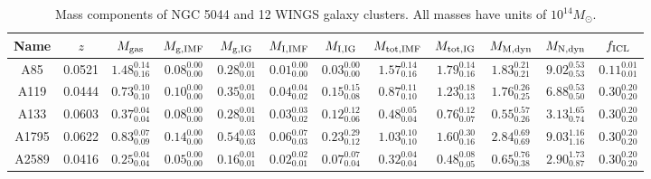      \begin{table}
     \caption{Mass components of NGC 5044 and 12 WINGS galaxy clusters. All masses have units of $10^{14}M_{\odot}$.}            %
     \label{WINGS_table}      %
     \centering                          %
     \begin{ruledtabular}
     \begin{tabular}{c c c c c c c c c c c c}        %
     Name &  $z$ &   $M_{\rm gas}$  &  $M_{\rm g,IMF}$  &  $M_{\rm g,IG}$   & $M_{\rm I,IMF}$  & $M_{\rm I,IG}$ & $M_{\rm tot,IMF}$ & $M_{\rm tot,IG}$ & $M_{\rm M,dyn}$  & $M_{\rm N,dyn}$ &  $f_{\rm ICL}$\\    %
     \hline                        %
     A85 & 0.0521 & $1.48^{0.14}_{0.16}$ & $0.08^{0.00}_{0.00}$ & $0.28^{0.01}_{0.01}$ & $0.01^{0.00}_{0.00}$ & $0.03^{0.00}_{0.00}$ & $1.57^{0.14}_{0.16}$ & $1.79^{0.14}_{0.16}$ & $1.83^{0.21}_{0.21}$ & $9.02^{0.53}_{0.53}$ & $0.11^{0.01}_{0.01}$ \\
     A119 & 0.0444 & $0.73^{0.10}_{0.10}$ & $0.10^{0.00}_{0.00}$ & $0.35^{0.01}_{0.01}$ & $0.04^{0.04}_{0.02}$ & $0.15^{0.15}_{0.08}$ & $0.87^{0.11}_{0.10}$ & $1.23^{0.18}_{0.13}$ & $1.76^{0.26}_{0.25}$ & $6.88^{0.53}_{0.50}$ & $0.30^{0.20}_{0.20}$ \\
     A133 & 0.0603 & $0.37^{0.04}_{0.04}$ & $0.08^{0.00}_{0.00}$ & $0.28^{0.01}_{0.01}$ & $0.03^{0.03}_{0.02}$ & $0.12^{0.12}_{0.06}$ & $0.48^{0.05}_{0.04}$ & $0.76^{0.12}_{0.07}$ & $0.55^{0.57}_{0.26}$ & $3.13^{1.65}_{0.74}$ & $0.30^{0.20}_{0.20}$ \\
     A1795 & 0.0622 & $0.83^{0.07}_{0.09}$ & $0.14^{0.00}_{0.00}$ & $0.54^{0.03}_{0.03}$ & $0.06^{0.07}_{0.03}$ & $0.23^{0.29}_{0.12}$ & $1.03^{0.10}_{0.10}$ & $1.60^{0.30}_{0.16}$ & $2.84^{0.69}_{0.69}$ & $9.03^{1.16}_{1.16}$ & $0.30^{0.20}_{0.20}$ \\
     A2589 & 0.0416 & $0.25^{0.04}_{0.04}$ & $0.05^{0.00}_{0.00}$ & $0.16^{0.01}_{0.01}$ & $0.02^{0.02}_{0.01}$ & $0.07^{0.07}_{0.04}$ & $0.32^{0.04}_{0.04}$ & $0.48^{0.08}_{0.05}$ & $0.65^{0.76}_{0.38}$ & $2.90^{1.73}_{0.87}$ & $0.30^{0.20}_{0.20}$ \\

\end{tabular}
\end{ruledtabular}
\end{table}
